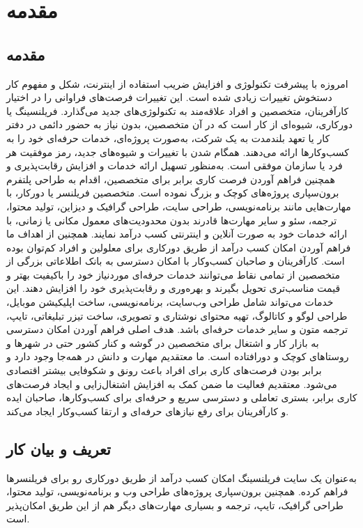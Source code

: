 \chapter{مقدمه}
\clearpage

\section*{مقدمه}
امروزه با پیشرفت تکنولوژی و افزایش ضریب استفاده از اینترنت، شکل و مفهوم کار دستخوش تغییرات زیادی شده است. این تغییرات فرصت‌های فراوانی را در اختیار کارآفرینان، متخصصین و افراد علاقه‌مند به تکنولوژی‌های جدید می‌گذارد.
فریلنسینگ یا دورکاری، شیوه‌ای از کار است که در آن متخصصین، بدون نیاز به حضور دائمی در دفتر کار یا تعهد بلندمدت به یک شرکت، به‌صورت پروژه‌ای، خدمات حرفه‌ای خود را به کسب‌وکارها ارائه می‌دهند. همگام شدن با تغییرات و شیوه‌های جدید، رمز موفقیت هر فرد یا سازمان موفقی است. به‌منظور تسهیل ارائه خدمات و افزایش رقابت‌پذیری و همچنین فراهم آوردن فرصت کاری برابر برای متخصصین، اقدام به طراحی پلتفرم برون‌سپاری پروژه‌های کوچک و بزرگ نموده است.
 متخصصین فریلنسر یا دورکار، با مهارت‌هایی مانند برنامه‌نویسی، طراحی سایت، طراحی گرافیک و دیزاین، تولید محتوا، ترجمه، سئو و سایر مهارت‌ها قادرند بدون محدودیت‌های معمول مکانی یا زمانی، با ارائه خدمات خود به صورت آنلاین و اینترنتی کسب درآمد نمایند. همچنین از اهداف ما فراهم آوردن امکان کسب درآمد از طریق دورکاری برای معلولین و افراد کم‌توان بوده است. کارآفرینان و صاحبان کسب‌وکار با امکان دسترسی به بانک اطلاعاتی بزرگی از متخصصین از تمامی نقاط می‌توانند خدمات حرفه‌ای موردنیاز خود را باکیفیت بهتر و قیمت مناسب‌تری تحویل بگیرند و بهره‌وری و رقابت‌پذیری خود را افزایش دهند. این خدمات می‌تواند شامل طراحی وب‌سایت، برنامه‌نویسی، ساخت اپلیکیشن موبایل، طراحی لوگو و کاتالوگ، تهیه محتوای نوشتاری و تصویری، ساخت تیزر تبلیغاتی، تایپ، ترجمه متون و سایر خدمات حرفه‌ای باشد.
هدف اصلی فراهم آوردن امکان دسترسی به بازار کار و اشتغال برای متخصصین در گوشه و کنار کشور حتی در شهرها و روستاهای کوچک و دورافتاده است. ما معتقدیم مهارت و دانش در همه‌جا وجود دارد و برابر بودن فرصت‌های کاری برای افراد باعث رونق و شکوفایی بیشتر اقتصادی می‌شود. معتقدیم فعالیت ما ضمن کمک به افزایش اشتغال‌زایی و ایجاد فرصت‌های کاری برابر، بستری تعاملی و دسترسی سریع و حرفه‌ای برای کسب‌وکارها، صاحبان ایده و کارآفرینان برای رفع نیازهای حرفه‌ای و ارتقا کسب‌وکار ایجاد می‌کند.
\section{تعریف و بیان کار}
 به‌عنوان یک سایت فریلنسینگ امکان کسب درآمد از طریق دورکاری رو برای فریلنسرها فراهم کرده. همچنین برون‌سپاری پروژه‌های طراحی وب و برنامه‌نویسی، تولید محتوا، طراحی گرافیک، تایپ، ترجمه و بسیاری مهارت‌های دیگر هم از این طریق امکان‌پذیر است.
 
